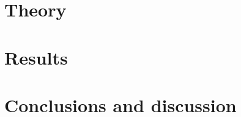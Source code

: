 \documentclass[x11names]{article}
\begin{document}
\section{Theory}
	

	

	

	

	


\section{Results}
	
	

	

	

	


\section{Conclusions and discussion}

	

	

	



% 
% 
\printbibliography
\end{document}
